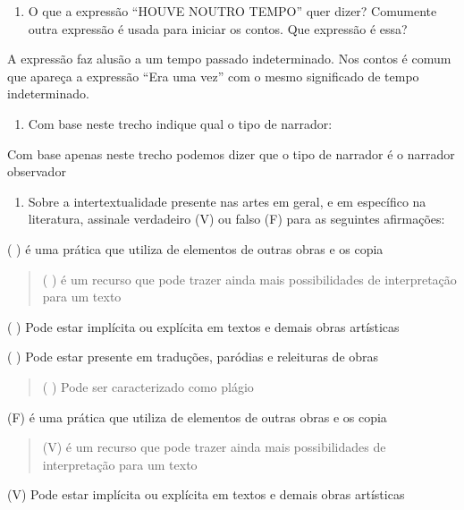 \begin{enumerate}
\def\labelenumi{\arabic{enumi})}
\setcounter{enumi}{5}
\tightlist
\item
  O que a expressão ``HOUVE NOUTRO TEMPO'' quer dizer? Comumente outra
  expressão é usada para iniciar os contos. Que expressão é essa?
\end{enumerate}

A expressão faz alusão a um tempo passado indeterminado. Nos contos é
comum que apareça a expressão ``Era uma vez'' com o mesmo significado de
tempo indeterminado.

\begin{enumerate}
\def\labelenumi{\arabic{enumi})}
\setcounter{enumi}{6}
\tightlist
\item
  Com base neste trecho indique qual o tipo de narrador:
\end{enumerate}

Com base apenas neste trecho podemos dizer que o tipo de narrador é o
narrador observador

\begin{enumerate}
\def\labelenumi{\arabic{enumi})}
\setcounter{enumi}{7}
\tightlist
\item
  Sobre a intertextualidade presente nas artes em geral, e em específico
  na literatura, assinale verdadeiro (V) ou falso (F) para as seguintes
  afirmações:
\end{enumerate}

( ) é uma prática que utiliza de elementos de outras obras e os copia

\begin{quote}
( ) é um recurso que pode trazer ainda mais possibilidades de
interpretação para um texto
\end{quote}

( ) Pode estar implícita ou explícita em textos e demais obras
artísticas

( ) Pode estar presente em traduções, paródias e releituras de obras

\begin{quote}
( ) Pode ser caracterizado como plágio
\end{quote}

(F) é uma prática que utiliza de elementos de outras obras e os copia

\begin{quote}
(V) é um recurso que pode trazer ainda mais possibilidades de
interpretação para um texto
\end{quote}

(V) Pode estar implícita ou explícita em textos e demais obras
artísticas

